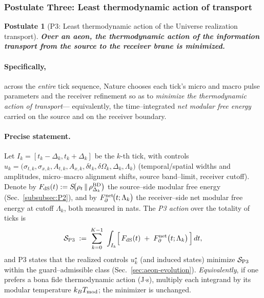 \documentclass[10pt]{article}
\theoremstyle{definition}
\theoremstyle{plain}
\newtheorem{postulate}{Postulate}[section]
\begin{document}
\subsubsection*{Postulate Three: Least thermodynamic action of transport}
\label{subsubsec:P3}
\begin{postulate}[P3: Least thermodynamic action of the Universe realization transport]
\label{post:P3}
    \textbf{Over an aeon, the thermodynamic action of the information transport from the source to the receiver brane is minimized.}
\end{postulate}
\paragraph{Specifically,}across the \emph{entire} tick sequence, Nature chooses each tick's micro and macro pulse parameters and the\label{par:uom-main-023}
receiver refinement so as to \emph{minimize the thermodynamic action of transport}—%
equivalently, the time–integrated \emph{net modular free energy} carried on the source
and on the receiver boundary.

\paragraph{Precise statement.}\label{par:uom-main-024}
Let $I_k=[t_k-\Delta_k,t_k+\Delta_k]$ be the $k$-th tick, with controls
$u_k=\big(\sigma_{t,k},\sigma_{x,k},A_{t,k},A_{x,k},\delta t_k,\delta\Omega_k,\Delta_k,\Lambda_k\big)$
(temporal/spatial widths and amplitudes, micro–macro alignment shifts, source band–limit,
receiver cutoff). Denote by
$F_{\rm dS}(t):=S\!\big(\rho_t\,\|\,\rho^{\rm BD}_{\Delta_k}\big)$
the source–side modular free energy (Sec.~\ref{subsubsec:P2}), and by
$F_\partial^{\rm net}\!\big(t;\Lambda_k\big)$ the receiver–side net modular free energy
at cutoff $\Lambda_k$, both measured in nats. The \emph{P3 action} over the totality
of ticks is
\begin{equation}
\label{eq:P3-action-master}
\mathcal S_{\rm P3}\;:=\;\sum_{k=0}^{K-1}\ \int_{I_k}\!\Big[\,F_{\rm dS}(t)\;+\;F_\partial^{\rm net}\big(t;\Lambda_k\big)\,\Big]\,dt,
\end{equation}
and P3 states that the realized controls $u_k^\star$ (and induced states) minimize
$\mathcal S_{\rm P3}$ within the guard–admissible class (Sec.~\ref{sec:aeon-evolution}).
\emph{Equivalently}, if one prefers a bona fide thermodynamic action (J$\cdot$s),
multiply each integrand by its modular temperature $k_B T_{\rm mod}$; the minimizer is
unchanged.
\end{document}

